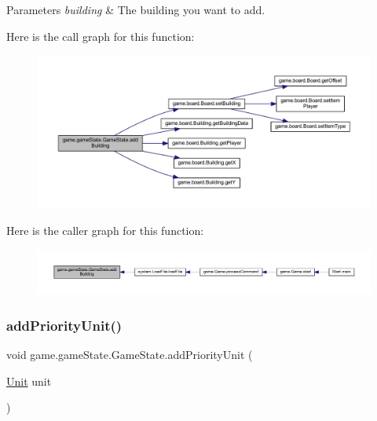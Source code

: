 \begin{DoxyParams}{Parameters}
{\em building} & The building you want to add. \\
\hline
\end{DoxyParams}
Here is the call graph for this function\+:
\nopagebreak
\begin{figure}[H]
\begin{center}
\leavevmode
\includegraphics[width=350pt]{classgame_1_1game_state_1_1_game_state_a1062a7a5164975ed330180b3ba47c7b2_cgraph}
\end{center}
\end{figure}
Here is the caller graph for this function\+:
\nopagebreak
\begin{figure}[H]
\begin{center}
\leavevmode
\includegraphics[width=350pt]{classgame_1_1game_state_1_1_game_state_a1062a7a5164975ed330180b3ba47c7b2_icgraph}
\end{center}
\end{figure}
\mbox{\label{classgame_1_1game_state_1_1_game_state_a3fbe9f547d5175914f4785a40d1871ad}} 
\subsubsection{\texorpdfstring{add\+Priority\+Unit()}{addPriorityUnit()}}
{\footnotesize\ttfamily void game.\+game\+State.\+Game\+State.\+add\+Priority\+Unit (\begin{DoxyParamCaption}\item[{\mbox{\hyperlink{classgame_1_1board_1_1_unit}{Unit}}}]{unit }\end{DoxyParamCaption})\hspace{0.3cm}{\ttfamily [inline]}}

